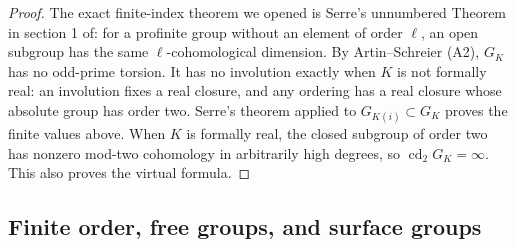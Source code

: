 \begin{proof}
The exact finite-index theorem we opened is Serre's unnumbered
Theorem in section 1 of\cite{AB_Serre1965}: for a profinite group
without an element of order $\ell$, an open subgroup has the same
$\ell$-cohomological dimension. By Artin--Schreier (A2), $G_K$ has
no odd-prime torsion. It has no involution exactly when $K$ is not
formally real: an involution fixes a real closure, and any ordering
has a real closure whose absolute group has order two. Serre's theorem
applied to $G_{K(i)}\subset G_K$ proves the finite values above.
When $K$ is formally real, the closed subgroup of order two has
nonzero mod-two cohomology in arbitrarily high degrees, so
$\operatorname{cd}_2G_K=\infty$. This also proves the virtual formula.
\end{proof}

\subsection{Finite order, free groups, and surface groups}


